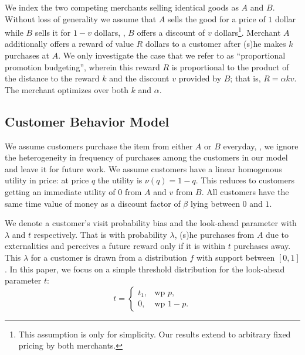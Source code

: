 We index the two competing merchants selling identical goods as $A$ and $B$.
Without loss of generality we assume that $A$ sells the good for a price of $1$ dollar while $B$ sells it for $1-v$ dollars, \ie, $B$ offers a discount of $v$ dollars\footnote{This assumption is only for simplicity. Our results extend to arbitrary fixed pricing by both merchants.}. 
Merchant $A$ additionally offers a reward of value $R$ dollars to a customer after (s)he makes $k$ purchases at $A$. 
We only investigate the case that we refer to as ``proportional promotion budgeting'', wherein this reward $R$ is proportional to the product of the distance to the reward $k$ and the discount $v$ provided by $B$;
that is, $R = \alpha k v$.
The merchant optimizes over both $k$ and $\alpha$.

\subsection{Customer Behavior Model}
We assume customers purchase the item from either $A$ or $B$ everyday, \ie, we ignore the heterogeneity in frequency of purchases among the customers in our model and leave it for future work.
We assume customers have a linear homogenous utility in price: at price $q$ the utility is $\nu(q) = 1-q$. 
This reduces to customers getting an immediate utility of $0$ from $A$ and $v$ from $B$.
All customers have the same time value of money as a discount factor of $\beta$ lying between $0$ and $1$.

We denote a customer's visit probability bias and the look-ahead parameter with $\lambda$ and $t$ respectively. 
That is with probability $\lambda$, (s)he purchases from $A$ due to externalities and perceives a future reward only if it is within $t$ purchases away. 
This $\lambda$ for a customer is drawn from a distribution $f$ with support between $[0,1]$.
In this paper, we focus on a simple threshold distribution for the look-ahead parameter $t$: 
\begin{equation*}
  t=\begin{cases}
    t_1, & \text{wp } p,\\
    0, & \text{wp } 1-p.
  \end{cases}
\end{equation*}

